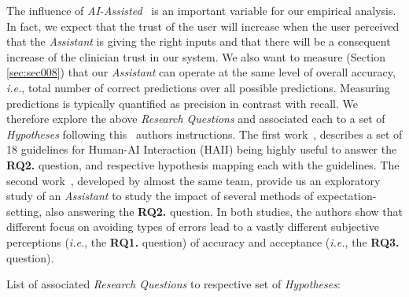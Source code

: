\hfill

The influence of \textit{AI-Assisted}~\cite{goodfellow2016deep} is an important variable for our empirical analysis. In fact, we expect that the trust of the user will increase when the user perceived that the \textit{Assistant} is giving the right inputs and that there will be a consequent increase of the clinician trust in our system. We also want to measure (Section \ref{sec:sec008}) that our \textit{Assistant} can operate at the same level of overall accuracy, {\it i.e.}, total number of correct predictions over all possible predictions. Measuring predictions is typically quantified as precision in contrast with recall. We therefore explore the above {\it Research Questions} and associated each to a set of {\it Hypotheses} following this~\cite{amershi2019guidelines, kocielnik2019will} authors instructions. The first work~\cite{amershi2019guidelines}, describes a set of 18 guidelines for Human-AI Interaction (HAII) being highly useful to answer the {\bf RQ2.} question, and respective hypothesis mapping each with the guidelines. The second work~\cite{kocielnik2019will}, developed by almost the same team, provide us an exploratory study of an {\it Assistant} to study the impact of several methods of expectation-setting, also answering the {\bf RQ2.} question. In both studies, the authors show that different focus on avoiding types of errors lead to a vastly different subjective perceptions ({\it i.e.}, the {\bf RQ1.} question) of accuracy and acceptance ({\it i.e.}, the {\bf RQ3.} question).

\clearpage

List of associated {\it Research Questions} to respective set of {\it Hypotheses}:

